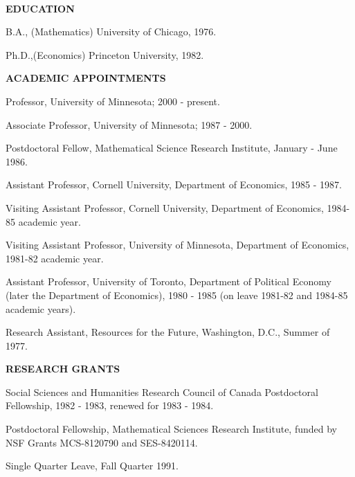 \documentclass[12pt]{article}
\begin{document}
\ \\
\noindent
{\bf EDUCATION}
\begin{description}
\item
B.A., (Mathematics) University of Chicago, 1976.
\item
Ph.D.,(Economics) Princeton University, 1982.
\end{description}

\noindent
{\bf ACADEMIC APPOINTMENTS}
\begin{description}
\item
Professor, University of Minnesota; 2000 - present. 
\item
Associate Professor, University of Minnesota; 1987 - 2000. 
\item
Postdoctoral Fellow, Mathematical Science Research Institute, January -
June 1986.
\item
Assistant Professor, Cornell University, Department of
Economics, 1985 - 1987.
\item
Visiting Assistant Professor, Cornell University,
Department of Economics, 1984-85 academic year.
\item
Visiting Assistant Professor, University of Minnesota,
Department of               Economics, 1981-82 academic year.
\item
Assistant Professor, University of Toronto, Department
of Political Economy (later the Department of Economics), 
1980 - 1985 (on leave 1981-82 and 1984-85 academic years).
\item
Research Assistant, Resources for the Future, 
Washington, D.C., Summer of 1977.
\end{description}

\noindent
{\bf RESEARCH GRANTS} 
\begin{description}
\item
Social Sciences and Humanities Research Council of Canada
Postdoctoral Fellowship, 1982 - 1983, renewed for 1983 - 1984.
\item
Postdoctoral Fellowship, Mathematical Sciences Research Institute,
funded by NSF Grants MCS-8120790 and SES-8420114.
\item
Single Quarter Leave, Fall Quarter 1991.
\end{description}
\end{document}
